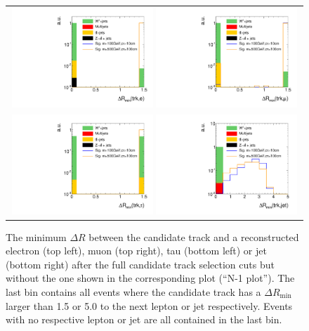 \begin{figure}[!t]
  \centering 
  \begin{tabular}{c}
    \includegraphics[width=0.49\textwidth]{figures/analysis/AnalysisSelection/htrackdRminElec_log.pdf}
    \includegraphics[width=0.49\textwidth]{figures/analysis/AnalysisSelection/htrackdRminMuon_log.pdf}\\

    \includegraphics[width=0.49\textwidth]{figures/analysis/AnalysisSelection/htrackdRminTau_log.pdf}
    \includegraphics[width=0.49\textwidth]{figures/analysis/AnalysisSelection/htrackdRminJet_log.pdf}
  \end{tabular}
  \caption{The minimum $\Delta R$ between the candidate track and a reconstructed electron (top left), muon (top right), tau (bottom left) or jet (bottom right) 
           after the full candidate track selection cuts but without the one shown in the corresponding plot (``N-1 plot''). 
           The last bin contains all events where the candidate track has a $\Delta R_{\text{min}}$ larger than 1.5 or 5.0 to the next lepton or jet respectively. 
           Events with no respective lepton or jet are all contained in the last bin.  }
  \label{fig:TrackdRmin}
\end{figure}

